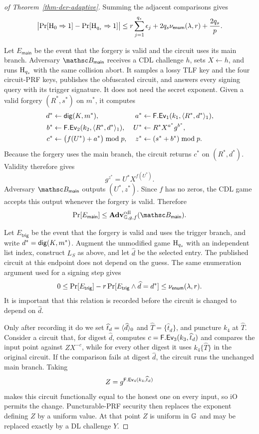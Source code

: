 \begin{proof}[of Theorem~\ref{thm-der-adaptive}]
Summing the adjacent comparisons gives
$$
\bigl|\Pr[\textnormal{H}_0\Rightarrow1]-\Pr[\textnormal{H}_{q_s}\Rightarrow1]\bigr|
\le
r\sum_{j=1}^{q_s}\epsilon_j
+2q_s\nu_{\mathsf{enum}}(\lambda,r)
+\frac{2q_s}{p}.
$$

 Let $E_{\mathsf{main}}$ be the event that the forgery is valid and the circuit uses its main branch. Adversary $\advB_{\mathsf{main}}$ receives a CDL challenge $h$, sets $X\gets h$, and runs $\textnormal{H}_{q_s}$ with the same collision abort. It samples a lossy TLF key and the four circuit-PRF keys, publishes the obfuscated circuit, and answers every signing query with its trigger signature. It does not need the secret exponent. Given a valid forgery $(R^*,s^*)$ on $m^*$, it computes
$$
\begin{aligned}
d^*&\gets\mathsf{dig}(K,m^*),
&a^*&\gets\mathsf{F}.\mathsf{Ev}_1(k_1,\langle R^*,d^* \rangle_1),\\
b^*&\gets\mathsf{F}.\mathsf{Ev}_2(k_2,\langle R^*,d^* \rangle_1),
&U^*&\gets R^*X^{a^*}g^{b^*},\\
c^*&\gets\bigl(f(U^*)+a^*\bigr)\bmod p,
&z^*&\gets(s^*+b^*)\bmod p.
\end{aligned}
$$
Because the forgery uses the main branch, the circuit returns $c^*$ on $(R^*,d^*)$. Validity therefore gives
$$
g^{z^*}=U^*X^{f(U^*)}.
$$
Adversary $\advB_{\mathsf{main}}$ outputs $(U^*,z^*)$. Since $f$ has no zeros, the CDL game accepts this output whenever the forgery is valid. Therefore
$$
\Pr[E_{\mathsf{main}}]
\le \AdvCDL{\GG,g,f}{\advB_{\mathsf{main}}}.
$$

 Let $E_{\mathsf{trig}}$ be the event that the forgery is valid and uses the trigger branch, and write $d^*=\mathsf{dig}(K,m^*)$. Augment the unmodified game $\textnormal{H}_{q_s}$ with an independent list index, construct $L_S$ as above, and let $\widehat d$ be the selected entry. The published circuit at this endpoint does not depend on the guess. The same enumeration argument used for a signing step gives
$$
0\le
\Pr[E_{\mathsf{trig}}]
-r\Pr[E_{\mathsf{trig}}\land\widehat d=d^*]
\le\nu_{\mathsf{enum}}(\lambda,r).
$$
It is important that this relation is recorded before the circuit is changed to depend on $\widehat d$.

Only after recording it do we set $\widehat t_d=\langle \widehat d \rangle_0$ and $\widehat T=\{\widehat t_d\}$, and puncture $k_4$ at $\widehat T$. Consider a circuit that, for digest $\widehat d$, computes $c=\mathsf{F}.\mathsf{Ev}_3(k_3,\widehat t_d)$ and compares the input point against $ZX^{-c}$, while for every other digest it uses $k_4\{\widehat T\}$ in the original circuit. If the comparison fails at digest $\widehat d$, the circuit runs the unchanged main branch. Taking
$$
Z=g^{\mathsf{F}.\mathsf{Ev}_4(k_4,\widehat t_d)}
$$
makes this circuit functionally equal to the honest one on every input, so iO permits the change. Puncturable-PRF security then replaces the exponent defining $Z$ by a uniform value. At that point $Z$ is uniform in $\mathbb{G}$ and may be replaced exactly by a DL challenge $Y$.


\end{proof}
